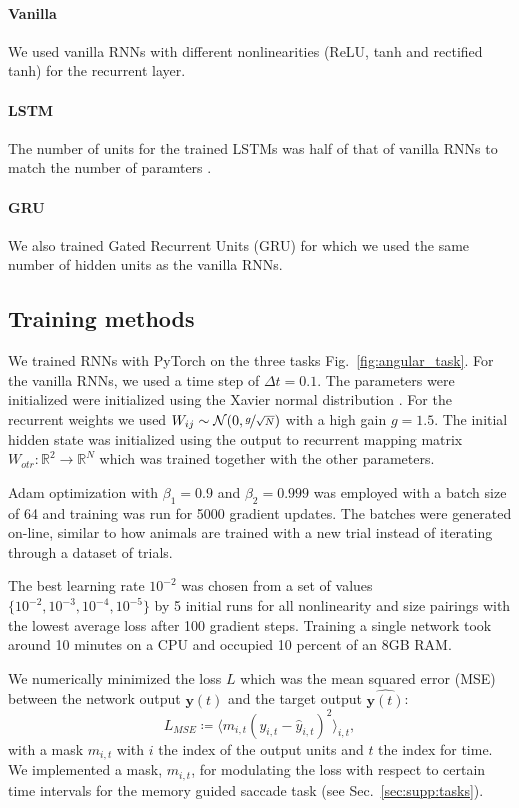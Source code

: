 \documentclass{article} %
\newcounter{ct}
\newcommand{\reals}{\mathbb{R}}
\theoremstyle{definition}
\theoremstyle{remark}
\begin{document}
\paragraph{Vanilla}
We used vanilla RNNs with different nonlinearities (ReLU, tanh and rectified tanh) for the recurrent layer.


\paragraph{LSTM}
The number of units for the trained LSTMs was half of that of vanilla RNNs to match the number of paramters \citep{Hochreiter1997}.


\paragraph{GRU}
We also trained Gated Recurrent Units (GRU) \citep{cho2014learning} for which we used the same number of hidden units as the vanilla RNNs.




\subsection{Training methods}
We trained  RNNs with PyTorch \citep{paszke2017automatic}  on the three tasks Fig.~\ref{fig:angular_task}.
For the vanilla RNNs, we used a time step of \(\Delta t = 0.1\).
The parameters were initialized were initialized using the Xavier normal distribution \citep{Glorot2010}.
For the recurrent weights we used \(W_{ij}\sim\mathcal{N}(0, \nicefrac{g}{\sqrt{N}})\) with a high gain \(g = 1.5\).
The initial hidden state was initialized using the output to recurrent mapping matrix \(W_{otr}\colon\reals^{2}\rightarrow\reals^{N}\) which was trained together with the other parameters.

Adam optimization with \(\beta_{1} = 0.9\) and \(\beta_{2} = 0.999\) was employed with a batch size of 64 and training was run for 5000 gradient updates.
The batches were generated on-line, similar to how animals are trained with a new trial instead of iterating through a dataset of trials.

The best learning rate \(10^{-2}\) was chosen from a set of values \(\{10^{-2},10^{-3},10^{-4},10^{-5}\}\) by 5 initial runs for all nonlinearity and size pairings with the lowest average loss after 100 gradient steps.
Training a single network took around 10 minutes on a CPU and occupied 10 percent of an 8GB RAM.

We numerically minimized the loss \(L\) which was the mean squared error (MSE) between the network output \(\mathbf{y}(t)\) and the target output \(\hat{\mathbf{y}(t)}\):
\begin{equation}\label{eq:loss}
L_{MSE} \coloneqq \langle m_{i, t}(y_{i, t}-\hat y_{i, t})^{2}\rangle_{i, t}, 
\end{equation}
with a mask \(m_{i, t}\) with \(i\) the index of the output units and \(t\)  the index for time.
We implemented a mask, \(m_{i, t}\), for modulating the loss with respect to certain time intervals for the memory guided saccade task (see Sec.~\ref{sec:supp:tasks}).
\end{document}
